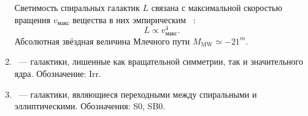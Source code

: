 \begin{enumerate}[itemsep=3pt, label={\arabic*.}, leftmargin=1pc]
{    Светимость спиральных галактик $L$ связана с  максимальной скоростью вращения $v_\text{макс}$ вещества в них эмпирическим ~\cite{tully_fisher}\cite{tully_fisher_correction}:
    \begin{equation}
        L \propto v_\text{макс}^4.
    \end{equation}
    Абсолютная звёздная величина Млечного пути $M_\text{MW} \simeq -21^m$.}
    \item{~--- галактики, лишенные как вращательной симметрии, так и значительного ядра. Обозначение: Irr.}
    \item{~--- галактики, являющиеся переходными между спиральными и эллиптическими. Обозначения: S0, SB0.}
\end{enumerate}

